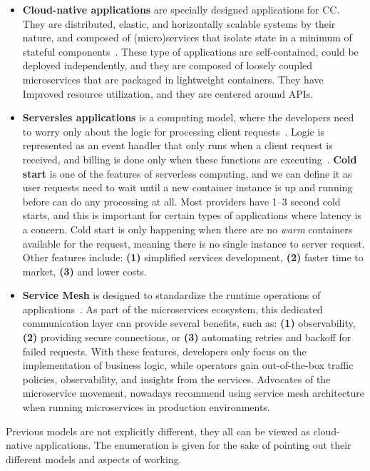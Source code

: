 \begin{itemize}
	\item \textbf{Cloud-native applications} are specially designed applications for CC. They are distributed, elastic, and horizontally scalable systems by their nature, and composed of (micro)services that isolate state in a minimum of stateful components~\cite{KratzkeQ17}. These type of applications are self-contained, could be deployed independently, and they are composed of loosely coupled microservices that are packaged in lightweight containers. They have Improved resource utilization, and they are centered around APIs.
	\item \textbf{Serversles applications} is a computing model, where the developers need to worry only about the logic for processing client requests~\cite{AdzicC17}. Logic is represented as an event handler that only runs when a client request is received, and billing is done only when these functions are executing~\cite{AdzicC17}. \textbf{Cold start} is one of the features of serverless computing, and we can define it as user requests need to wait until a new container instance is up and running before can do any processing at all. Most providers have 1–3 second cold starts, and this is important for certain types of applications where latency is a concern. Cold start is only happening when there are no \textit{warm} containers available for the request, meaning there is no single instance to server request. Other features include: \textbf{(1)} simplified services development, \textbf{(2)} faster time to market, \textbf{(3)} and lower costs.
	\item \textbf{Service Mesh} is designed to standardize the runtime operations of applications~\cite{LiLGZH19}. As part of the microservices ecosystem, this dedicated communication layer can provide several benefits, such as: \textbf{(1)} observability, \textbf{(2)} providing secure connections, or \textbf{(3)} automating retries and backoff for failed requests. With these features, developers only focus on the implementation of business logic, while operators gain out-of-the-box traffic policies, observability, and insights from the services. Advocates of the microservice movement, nowadays recommend using service mesh architecture when running microservices in production environments.
\end{itemize}

\noindent
Previous models are not explicitly different, they all can be viewed as cloud-native applications. The enumeration is given for the sake of pointing out their different models and aspects of working.

